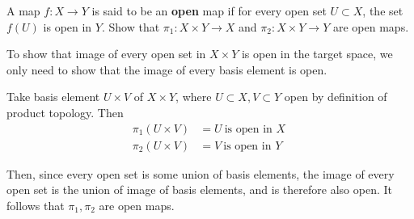 \documentclass[a4paper, 12pt]{article}
\begin{document}
\begin{problem} 
A map $f: X \to Y$ is said to be an \textbf{open} map if for every open set $U \subset X$, the set $f(U)$ is open in $Y$. Show that $\pi_1: X \times Y \to X$ and $\pi_2: X \times Y \to Y$ are open maps.
\end{problem}
\begin{solution}
    To show that image of every open set in $X \times Y$ is open in the target space, we only need to show that the image of every basis element is open.

    Take basis element $U \times V$ of $X \times Y$, where $U \subset X, V \subset Y$ open by definition of product topology. Then \begin{align*}
        \pi_1(U \times V) &= U  \:\text{is open in $X$}\: \\
        \pi_2(U \times V) &= V  \:\text{is open in $Y$}\:
    \end{align*}

    Then, since every open set is some union of basis elements, the image of every open set is the union of image of basis elements, and is therefore also open. It follows that $\pi_1, \pi_2$ are open maps.
\end{solution}
\end{document}
